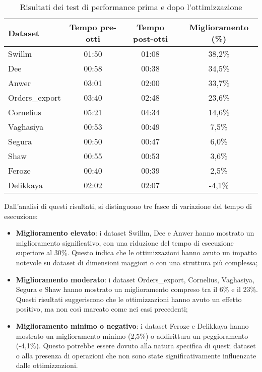 \begin{table}[h]
    \centering
    \begin{tabular}{|l|c|c|c|}
        \hline
        \textbf{Dataset} & \textbf{Tempo pre-otti} & \textbf{Tempo post-otti} & \textbf{Miglioramento (\%)} \\
        \hline
        Swillm & 01:50 & 01:08 & 38,2\% \\
        Dee & 00:58 & 00:38 & 34,5\% \\
        Anwer & 03:01 & 02:00 & 33,7\% \\
        Orders\_export & 03:40 & 02:48 & 23,6\% \\
        Cornelius & 05:21 & 04:34 & 14,6\% \\
        Vaghasiya & 00:53 & 00:49 & 7,5\% \\
        Segura & 00:50 & 00:47 & 6,0\% \\
        Shaw & 00:55 & 00:53 & 3,6\% \\
        Feroze & 00:40 & 00:39 & 2,5\% \\
        Delikkaya & 02:02 & 02:07 & -4,1\% \\
        \hline
    \end{tabular}
    \caption{Risultati dei test di performance prima e dopo l'ottimizzazione}
    \label{tab:performance-tests}
\end{table}

\newpage

Dall'analisi di questi risultati, si distinguono tre fasce di variazione del tempo di esecuzione:
\begin{itemize}
    \item \textbf{Miglioramento elevato}: i dataset Swillm, Dee e Anwer hanno mostrato un miglioramento significativo, con una riduzione del tempo di esecuzione superiore al 30\%. Questo indica che le ottimizzazioni hanno avuto un impatto notevole su dataset di dimensioni maggiori o con una struttura più complessa;
    \item \textbf{Miglioramento moderato}: i dataset Orders\_export, Cornelius, Vaghasiya, Segura e Shaw hanno mostrato un miglioramento compreso tra il 6\% e il 23\%. Questi risultati suggeriscono che le ottimizzazioni hanno avuto un effetto positivo, ma non così marcato come nei casi precedenti;
    \item \textbf{Miglioramento minimo o negativo}: i dataset Feroze e Delikkaya hanno mostrato un miglioramento minimo (2,5\%) o addirittura un peggioramento (-4,1\%). Questo potrebbe essere dovuto alla natura specifica di questi dataset o alla presenza di operazioni che non sono state significativamente influenzate dalle ottimizzazioni.
\end{itemize}

